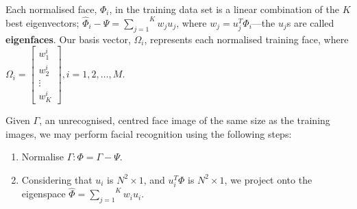 Each normalised face, $\varPhi_{i}$, in the training data set is a linear combination of the $K$ best eigenvectors; $\hat{\varPhi}_{i} - \varPsi = \overset{K}{\underset{j=1}{\sum}} w_{j} u_{j}$, where $w_{j} = u_{j}^{T} \varPhi_{i}$---the $u_{j}$s are called \textbf{eigenfaces}. Our basis vector, $\Omega_{i}$, represents each normalised training face, where $\Omega_{i} = \begin{bmatrix}w_{1}^{i}\\w_{2}^{i}\\ \vdots\\ w_{K}^{i} \end{bmatrix}, i = 1, 2, \ldots, M$.

Given $\varGamma$, an unrecognised, centred face image of the same size as the training images, we may perform facial recognition using the following steps:
\begin{enumerate}
    \item Normalise $\varGamma: \varPhi = \varGamma - \varPsi$.
    \item Considering that $u_{i}$ is $N^{2} \times 1$, and $u_{i}^{T} \varPhi$ is $N^{2} \times 1$, we project onto the eigenspace $\hat{\varPhi} = \overset{K}{\underset{j=1}{\sum}} w_{i} u_{i}$.
\end{enumerate}


